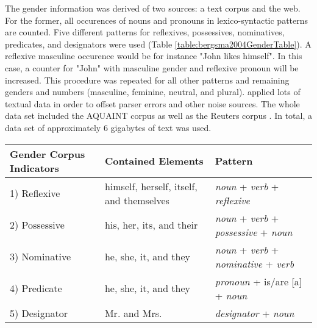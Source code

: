 The gender information was derived of two sources: a text corpus and the web. 
For the former, all occurences of nouns and pronouns in lexico-syntactic patterns are counted. Five different patterns for reflexives, possessives, nominatives, predicates, and designators were used (Table \ref{table:bergsma2004GenderTable}). A reflexive masculine occurence would be for instance "John likes himself". In this case, a counter for "John" with masculine gender and reflexive pronoun will be increased. This procedure was repeated for all other patterns and remaining genders and numbers (masculine, feminine, neutral, and plural).  \cite{bergsma2005automatic} applied lots of textual data in order to offset parser errors and other noise sources. The whole data set included the AQUAINT corpus \citep{graff2002aquaint} as well as the Reuters corpus \citep{rose2002reuters}. In total, a data set of approximately 6 gigabytes of text was used.

\begin{center}
    \begin{tabular}{| l | p{5cm} | p{5cm} |}
    \hline
    Gender Corpus Indicators & Contained Elements & Pattern \\ \hline
\hline
    1) Reflexive & himself, herself, itself, and themselves &  \textit{noun} + \textit{verb} + \textit{reflexive}\\ \hline
    2) Possessive & his, her, its, and their & \textit{noun} + \textit{verb} + \textit{possessive} + \textit{noun} \\ \hline
    3) Nominative & he, she, it, and they & \textit{noun} + \textit{verb} + \textit{nominative} +  \textit{verb} \\ \hline
    4) Predicate & he, she, it, and they & \textit{pronoun} +  is/are [a] + \textit{noun}  \\ \hline
    5) Designator & Mr. and Mrs. & \textit{designator} + \textit{noun}\\ \hline
    \end{tabular}
     \label{table:bergsma2004GenderTable}
\end{center}

